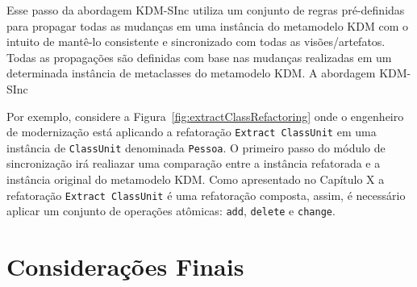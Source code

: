 Esse passo da abordagem KDM-SInc utiliza um conjunto de regras pré-definidas para propagar todas as mudanças em uma instância do metamodelo KDM com o intuito de mantê-lo consistente e sincronizado com todas as visões/artefatos. Todas as propagações são definidas com base nas mudanças realizadas em um determinada instância de metaclasses do metamodelo KDM. A abordagem KDM-SInc 

Por exemplo, considere a Figura~\ref{fig:extractClassRefactoring} onde o engenheiro de modernização está aplicando a refatoração \texttt{Extract ClassUnit} em uma instância de \texttt{ClassUnit} denominada \texttt{Pessoa}. O primeiro passo do módulo de sincronização irá realiazar uma comparação entre a instância refatorada e a instância original do metamodelo KDM. Como apresentado no Capítulo X a refatoração \texttt{Extract ClassUnit} é uma refatoração composta, assim, é necessário aplicar um conjunto de operações atômicas: \texttt{add}, \texttt{delete} e \texttt{change}.




\section{Considerações Finais}